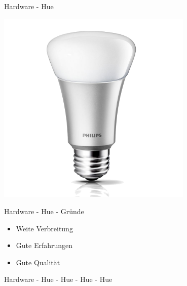 \begin{frame}{Hardware - Hue}
  \begin{center}
    \includegraphics[width=0.7\textwidth]{images/hue}
    \label{fig:hue}
  \end{center}
\end{frame}

\begin{frame}{Hardware - Hue - Gründe}
  \Large
  \begin{itemize}
    \item Weite Verbreitung
    \item Gute Erfahrungen
    \item Gute Qualität
  \end{itemize}
\end{frame}

\begin{frame}{Hardware - Hue - Hue - Hue - Hue}
  \Large
\end{frame}